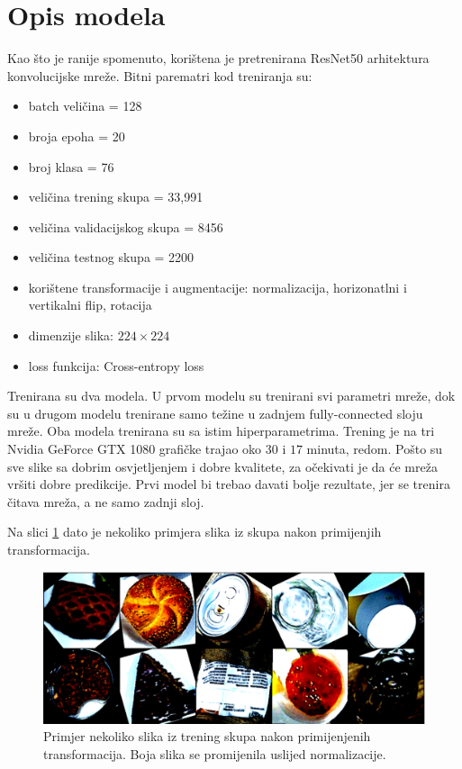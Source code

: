 \documentclass[conference]{IEEEtran}
\begin{document}
\section{Opis modela}

Kao što je ranije spomenuto, korištena je pretrenirana ResNet50 arhitektura konvolucijske mreže. Bitni parematri kod treniranja su:

\begin{itemize}
  \item batch veličina = 128
  \item broja epoha = 20
  \item broj klasa = 76
  \item veličina trening skupa = 33,991
  \item veličina validacijskog skupa = 8456
  \item veličina testnog skupa = 2200
  \item korištene transformacije i augmentacije: normalizacija, horizonatlni i vertikalni flip, rotacija
  \item dimenzije slika: $224\times224$
  \item loss funkcija: Cross-entropy loss
\end{itemize}

Trenirana su dva modela. U prvom modelu su trenirani svi parametri mreže, dok su u drugom modelu trenirane samo težine u zadnjem fully-connected sloju mreže. Oba modela trenirana su sa istim hiperparametrima. Trening je na tri Nvidia GeForce GTX 1080 grafičke trajao oko $30$ i $17$ minuta, redom. Pošto su sve slike sa dobrim osvjetljenjem i dobre kvalitete, za očekivati je da će mreža vršiti dobre predikcije. Prvi model bi trebao davati bolje rezultate, jer se trenira čitava mreža, a ne samo zadnji sloj. 

Na slici \ref{fig4} dato je nekoliko primjera slika iz skupa nakon primijenjih transformacija.  

\begin{figure}[htbp]
\centerline{\includegraphics[width=\columnwidth]{fig4.png}}
\caption{Primjer nekoliko slika iz trening skupa nakon primijenjenih transformacija. Boja slika se promijenila uslijed normalizacije.}
\label{fig4}
\end{figure}
\\
\end{document}
